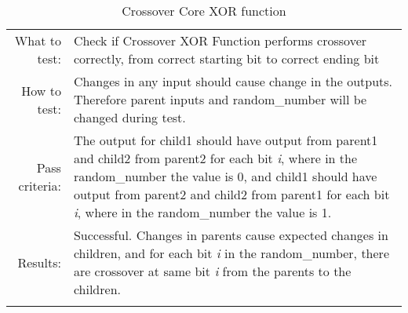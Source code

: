\begin{table}[H]
  \begin{tabular}{r | p{9cm}}
    \noalign{\smallskip}\hline\noalign{\smallskip}
    
    What to test:  & Check if Crossover XOR Function performs crossover
                     correctly, from correct starting bit to correct ending bit \\

    \noalign{\smallskip}\hline\noalign{\smallskip}

    How to test:   &    Changes in any input should cause change in the outputs.
                        Therefore parent inputs and random\_number will be changed
                        during test.  
                        \\
                      
    \noalign{\smallskip}\hline\noalign{\smallskip}

    Pass criteria: &    The output for child1 should have output from parent1 and child2
                        from parent2 for each bit \emph{i}, where in the random\_number 
                        the value is 0, and child1 should have output from parent2 and 
                        child2 from parent1 for each bit \emph{i}, where in the 
                        random\_number the value is 1.
                        \\
    \noalign{\smallskip}\hline\noalign{\smallskip}
    
    Results: &      Successful.
                    Changes in parents cause expected changes in children, and for each
                    bit \emph{i} in the random\_number, there are crossover at same bit    
                    \emph{i} from the parents to the children.
                    \\
   \noalign{\smallskip}\hline\noalign{\smallskip}
  
  
  
  \end{tabular}
  \caption{Crossover Core XOR function}
  \label{testing:components:genetic_pipeline:crossover_core_xor}
\end{table}
